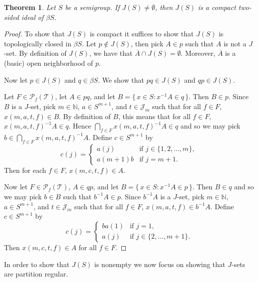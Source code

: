\documentclass[12pt]{article}
\theoremstyle{plain}
\newtheorem{thm}{Theorem}[section]
\theoremstyle{definition}
\newcommand{\bbN}{\mathbb{N}}
\newcommand{\calJ}{\mathcal{J}}
\newcommand{\calT}{\mathcal{T}}
\newcommand{\Pf}{\mathcal{P}_f}
\begin{document}
\begin{thm}
  Let $S$ be a semigroup. 
  If $J(S) \ne \emptyset$, then $J(S)$ is a compact two-sided ideal of
  $\beta S$. 
\end{thm}
\begin{proof}
  To show that $J(S)$ is compact it suffices to show that $J(S)$ is
  topologically closed in $\beta S$.
  Let $p \not\in J(S)$, then pick $A \in p$ such that $A$ is not a
  $J$-set. 
  By definition of $J(S)$, we have that $\overline{A} \cap J(S) =
  \emptyset$. 
  Moreover, $\overline{A}$ is a (basic) open neighborhood of $p$. 

  Now let $p \in J(S)$ and $q \in \beta S$. 
  We show that $pq \in J(S)$ and $qp \in J(S)$. 

  Let $F \in \Pf(\calT)$, let $A \in pq$, and let $B = \{\, x \in S :
  x^{-1}A \in q \,\}$. 
  Then $B \in p$. 
  Since $B$ is a $J$-set, pick $m \in \bbN$, $a \in S^{m+1}$, and $t
  \in \calJ_m$ such that for all $f \in F$, $x(m, a, t, f) \in B$. 
  By definition of $B$, this means that for all $f \in F$, $x(m, a, t,
  f)^{-1} A \in q$.
  Hence $\bigcap_{f \in F} x(m, a, t, f)^{-1} A \in q$ and so we may
  pick $b \in \bigcap_{f \in F} x(m, a, t, f)^{-1} A$.
  Define $c \in S^{m+1}$ by
  \[
    c(j) = 
    \begin{cases}
      a(j) & \mbox{if $j \in \{1, 2, \ldots, m\}$}, \\
      a(m+1)b & \mbox{if $j = m+1$}.
    \end{cases}
  \]
  Then for each $f \in F$, $x(m, c, t, f) \in A$. 

  Now let $F \in \Pf(\calT)$, $A \in qp$, and let $B = \{\, x \in S :
  x^{-1}A \in p \,\}$.
  Then $B \in q$ and so we may pick $b \in B$ such that $b^{-1}A \in
  p$. 
  Since $b^{-1}A$ is a $J$-set, pick $m \in \bbN$, $a \in S^{m+1}$,
  and $t \in \calJ_m$ such that for all $f \in F$, $x(m, a, t, f) \in
  b^{-1}A$. 
  Define $c \in S^{m+1}$ by
  \[
    c(j) = 
    \begin{cases}
      ba(1) & \mbox{if $j = 1$}, \\
      a(j) & \mbox{if $j \in \{2, \ldots, m+1\}$}.
    \end{cases}
  \]
  Then $x(m, c, t, f) \in A$ for all $f \in F$.
\end{proof}

In order to show that $J(S)$ is nonempty we now focus on showing that
$J$-sets are partition regular. 
\end{document}

